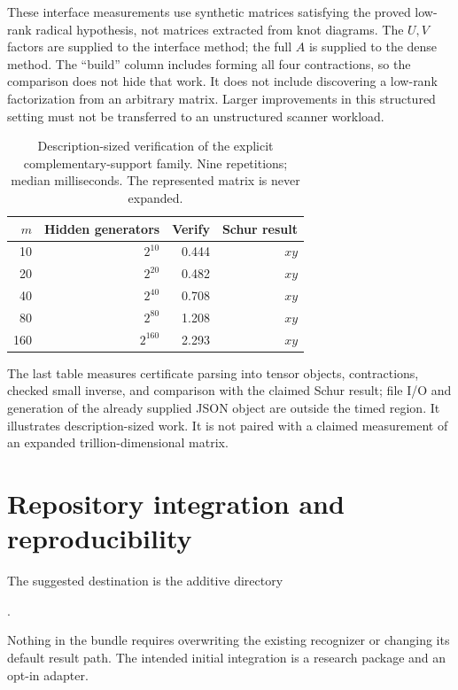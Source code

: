 \documentclass[11pt]{article}
\theoremstyle{definition}\newtheorem{definition}[theorem]{Definition}
\theoremstyle{remark}\newtheorem{remark}[theorem]{Remark}
\begin{document}
These interface measurements use synthetic matrices satisfying the proved low-rank radical hypothesis, not matrices extracted from knot diagrams. The $U,V$ factors are supplied to the interface method; the full $A$ is supplied to the dense method. The ``build'' column includes forming all four contractions, so the comparison does not hide that work. It does not include discovering a low-rank factorization from an arbitrary matrix. Larger improvements in this structured setting must not be transferred to an unstructured scanner workload.

\begin{table}[htbp]
\centering\small
\begin{tabular}{rrrr}
\toprule
$m$ & Hidden generators & Verify & Schur result \\
\midrule
10 & $2^{10}$ & 0.444 & $xy$ \\
20 & $2^{20}$ & 0.482 & $xy$ \\
40 & $2^{40}$ & 0.708 & $xy$ \\
80 & $2^{80}$ & 1.208 & $xy$ \\
160 & $2^{160}$ & 2.293 & $xy$ \\
\bottomrule
\end{tabular}
\caption{Description-sized verification of the explicit complementary-support family. Nine repetitions; median milliseconds. The represented matrix is never expanded.}
\label{tab:succinct}
\end{table}

The last table measures certificate parsing into tensor objects, contractions, checked small inverse, and comparison with the claimed Schur result; file I/O and generation of the already supplied JSON object are outside the timed region. It illustrates description-sized work. It is not paired with a claimed measurement of an expanded trillion-dimensional matrix.

\section{Repository integration and reproducibility}
\label{sec:integration}
The suggested destination is the additive directory
\begin{center}
.
\end{center}
Nothing in the bundle requires overwriting the existing recognizer or changing its default result path. The intended initial integration is a research package and an opt-in adapter.
\end{document}
